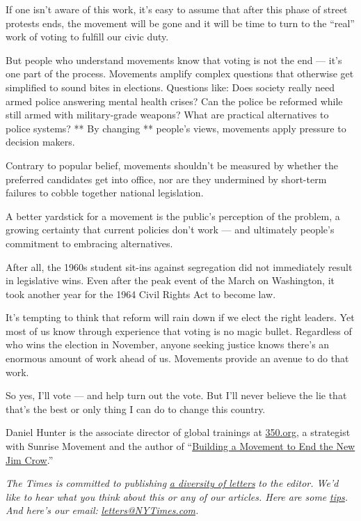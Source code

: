 If one isn't aware of this work, it's easy to assume that after this
phase of street protests ends, the movement will be gone and it will be
time to turn to the ``real'' work of voting to fulfill our civic duty.

But people who understand movements know that voting is not the end ---
it's one part of the process. Movements amplify complex questions that
otherwise get simplified to sound bites in elections. Questions like:
Does society really need armed police answering mental health crises?
Can the police be reformed while still armed with military-grade
weapons? What are practical alternatives to police systems? ** By
changing ** people's views, movements apply pressure to decision makers.

Contrary to popular belief, movements shouldn't be measured by whether
the preferred candidates get into office, nor are they undermined by
short-term failures to cobble together national legislation.

A better yardstick for a movement is the public's perception of the
problem, a growing certainty that current policies don't work --- and
ultimately people's commitment to embracing alternatives.

After all, the 1960s student sit-ins against segregation did not
immediately result in legislative wins. Even after the peak event of the
March on Washington, it took another year for the 1964 Civil Rights Act
to become law.

It's tempting to think that reform will rain down if we elect the right
leaders. Yet most of us know through experience that voting is no magic
bullet. Regardless of who wins the election in November, anyone seeking
justice knows there's an enormous amount of work ahead of us. Movements
provide an avenue to do that work.

So yes, I'll vote --- and help turn out the vote. But I'll never believe
the lie that that's the best or only thing I can do to change this
country.

Daniel Hunter is the associate director of global trainings at
\href{http://trainings.350.org/}{350.org}, a strategist with Sunrise
Movement and the author of
``\href{http://www.newjimcroworganizing.org/}{Building a Movement to End
the New Jim Crow}.''

\emph{The Times is committed to publishing}
\href{https://www.nytimes3xbfgragh.onion/2019/01/31/opinion/letters/letters-to-editor-new-york-times-women.html}{\emph{a
diversity of letters}} \emph{to the editor. We'd like to hear what you
think about this or any of our articles. Here are some}
\href{https://help.nytimes3xbfgragh.onion/hc/en-us/articles/115014925288-How-to-submit-a-letter-to-the-editor}{\emph{tips}}\emph{.
And here's our email:}
\href{mailto:letters@NYTimes.com}{\emph{letters@NYTimes.com}}\emph{.}

